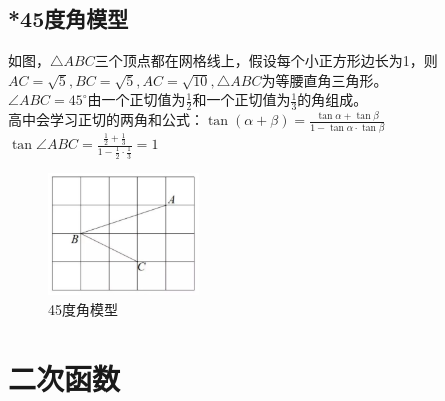 \documentclass{ecnuthesis}
\begin{document}
\section{*45度角模型}
\begin{knowledge}
    如图，$\triangle ABC$三个顶点都在网格线上，假设每个小正方形边长为1，则$AC=\sqrt5,BC=\sqrt5,AC=\sqrt{10},\triangle ABC$为等腰直角三角形。\\
    $\angle ABC=45^\circ$由一个正切值为$\frac{1}{2}$和一个正切值为$\frac{1}{3}$的角组成。\\
    高中会学习正切的两角和公式：$\tan(\alpha+\beta)=\frac{\tan \alpha+\tan \beta}{1-\tan \alpha·\tan \beta}$ \\
    $\tan \angle ABC=\frac{\frac{1}{2}+\frac{1}{3}}{1-\frac{1}{2}·\frac{1}{3}}=1$ \\
\end{knowledge}
\begin{figure}[H]
\centering
\includegraphics[width=4cm]{picture/903.png}
\caption{45度角模型}
\end{figure}
\clearpage
\chapter{二次函数}
\end{document}
